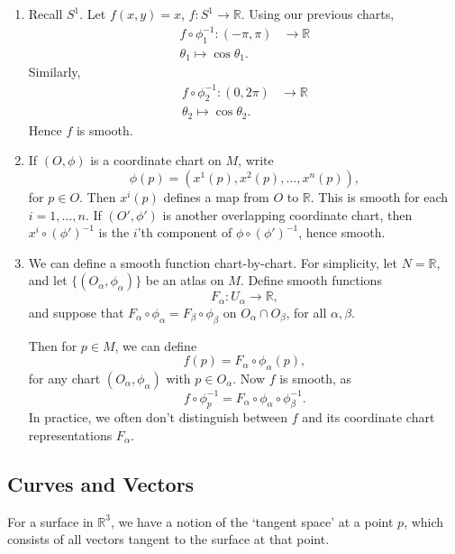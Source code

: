 \documentclass[12pt]{article}
\begin{document}
\begin{exbox}
	\begin{enumerate}
		\item Recall $S^1$. Let $f(x, y) = x$, $f : S^1 \to \mathbb{R}$. Using our previous charts,
			\begin{align*}
				f \circ \phi_1^{-1} : (-\pi, \pi) &\to \mathbb{R} \\
				\theta_1 \mapsto \cos \theta_1.
			\end{align*}
			Similarly,
			\begin{align*}
				f \circ \phi_2^{-1} : (0, 2\pi) &\to \mathbb{R} \\
				\theta_2 \mapsto \cos \theta_2.
			\end{align*}
			Hence $f$ is smooth.
		\item If $(O, \phi)$ is a coordinate chart on $M$, write
			\[
			\phi(p) = (x^1(p), x^2(p), \ldots, x^n(p)),
			\]
			for $p \in O$. Then $x^i(p)$ defines a map from $O$ to $\mathbb{R}$. This is smooth for each $i = 1, \ldots, n$. If $(O', \phi')$ is another overlapping coordinate chart, then $x^i \circ (\phi')^{-1}$ is the $i$'th component of $\phi \circ (\phi')^{-1}$, hence smooth.
		\item We can define a smooth function chart-by-chart. For simplicity, let $N = \mathbb{R}$, and let $\{(O_\alpha, \phi_\alpha)\}$ be an atlas on $M$. Define smooth functions
			\[
			F_\alpha : U_\alpha \to \mathbb{R},
			\]
			and suppose that $F_\alpha \circ \phi_\alpha = F_\beta \circ \phi_\beta$ on $O_\alpha \cap O_\beta$, for all $\alpha, \beta$.

			Then for $p \in M$, we can define
			\[
			f(p) = F_\alpha \circ \phi_\alpha(p),
			\]
			for any chart $(O_\alpha, \phi_\alpha)$ with $p \in O_\alpha$. Now $f$ is smooth, as
			\[
			f \circ \phi_p^{-1} = F_\alpha \circ \phi_\alpha \circ \phi_\beta^{-1}.
			\]
			In practice, we often don't distinguish between $f$ and its coordinate chart representations $F_\alpha$.
	\end{enumerate}	
\end{exbox}

\subsection{Curves and Vectors}%
\label{sub:cav}

For a surface in $\mathbb{R}^3$, we have a notion of the `tangent space' at a point $p$, which consists of all vectors tangent to the surface at that point.
\end{document}
